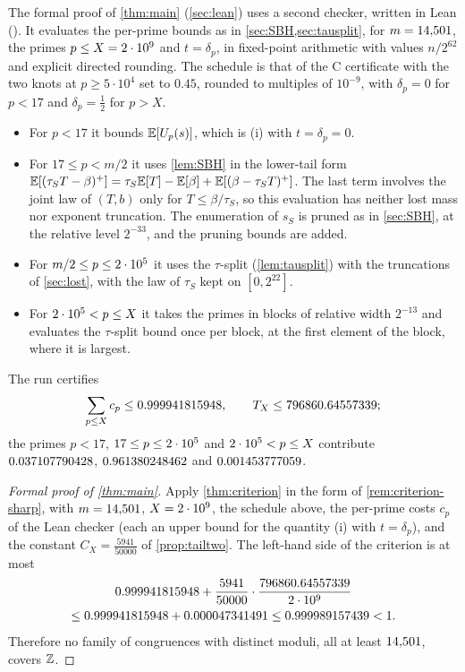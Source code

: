 The formal proof of \cref{thm:main} (\cref{sec:lean}) uses a second checker, written in Lean (). It
evaluates the per-prime bounds as in \cref{sec:SBH,sec:tausplit}, for $m=14{,}501$, the primes $p\le X=2\cdot10^{9}$ and
$t=\delta_p$, in fixed-point arithmetic with values $n/2^{62}$ and explicit directed rounding. The schedule is that of
the C certificate with the two knots at $p\ge5\cdot10^4$ set to $0.45$, rounded to multiples of $10^{-9}$, with
$\delta_p=0$ for $p<17$ and $\delta_p=\frac12$ for $p>X$.
\begin{itemize}
\item For $p<17$ it bounds $\mathbb{E}[U_p(s)]$, which is (i) with $t=\delta_p=0$.
\item For $17\le p<m/2$ it uses \cref{lem:SBH} in the lower-tail form
  $\mathbb{E}[(\tau_ST-\beta)^+]=\tau_S\mathbb{E}[T]-\mathbb{E}[\beta]+\mathbb{E}[(\beta-\tau_ST)^+]$. The last term involves the joint law of $(T,b)$
  only for $T\le\beta/\tau_S$, so this evaluation has neither lost mass nor exponent truncation. The enumeration of
  $s_S$ is pruned as in \cref{sec:SBH}, at the relative level $2^{-33}$, and the pruning bounds are added.
\item For $m/2\le p\le2\cdot 10^{5}$ it uses the $\tau$-split (\cref{lem:tausplit}) with the truncations of \cref{sec:lost},
  with the law of $\tau_S$ kept on $[0,2^{22}]$.
\item For $2\cdot 10^{5}<p\le X$ it takes the primes in blocks of relative width $2^{-13}$ and evaluates the $\tau$-split
  bound once per block, at the first element of the block, where it is largest.
\end{itemize}
The run certifies
\[
  \sum_{p\le X}c_p\le0.999941815948,\qquad T_X\le796860.64557339;
\]
the primes $p<17$, $17\le p\le2\cdot 10^{5}$ and $2\cdot 10^{5}<p\le X$ contribute $0.037107790428$, $0.961380248462$ and $0.001453777059$.

\begin{proof}[Formal proof of \cref{thm:main}]
Apply \cref{thm:criterion} in the form of \cref{rem:criterion-sharp}, with $m=14{,}501$, $X=2\cdot10^{9}$, the schedule above,
the per-prime costs $c_p$ of the Lean checker (each an upper bound for the quantity (i) with $t=\delta_p$), and the
constant $C_X=\frac{5941}{50000}$ of \cref{prop:tailtwo}. The left-hand side of the criterion is at most
\begin{multline*}
  0.999941815948+\frac{5941}{50000}\cdot\frac{796860.64557339}{2\cdot10^{9}}\\
  \le0.999941815948+0.000047341491\le0.999989157439<1 .
\end{multline*}
Therefore no family of congruences with distinct moduli, all at least $14{,}501$, covers $\mathbb{Z}$.
\end{proof}

